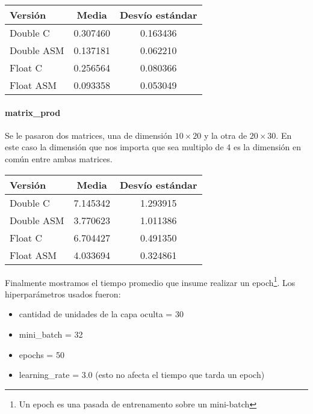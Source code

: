 \begin{center}
    \begin{tabular}{| l | c | c |}
                \hline
    Versión & Media & Desvío estándar \\
                \hline
    Double C & 0.307460 & 0.163436 \\
    Double ASM & 0.137181 & 0.062210 \\
    Float C & 0.256564 & 0.080366 \\
    Float ASM  & 0.093358 & 0.053049 \\
                \hline
            
        \end{tabular}
\end{center}

\paragraph{matrix\_prod}

Se le pasaron dos matrices, una de dimensión $10\times 20$ y la otra de $20\times 30$. En este caso la dimensión que nos importa que sea multiplo de 4 es la dimensión en común entre ambas matrices.

\begin{center}
    \begin{tabular}{| l | c | c |}
                \hline
    Versión & Media & Desvío estándar \\
                \hline
    Double C & 7.145342 & 1.293915 \\
    Double ASM & 3.770623 & 1.011386 \\
    Float C & 6.704427 & 0.491350 \\
    Float ASM  & 4.033694 & 0.324861 \\
                \hline
            
        \end{tabular}
\end{center}

Finalmente mostramos el tiempo promedio que insume realizar un epoch\footnote{Un epoch es una pasada de entrenamento sobre un mini-batch}. Los hiperparámetros usados fueron:
\begin{itemize}
    \item cantidad de unidades de la capa oculta = 30
    \item mini\_batch = 32
    \item epochs = 50
    \item learning\_rate = 3.0 (esto no afecta el tiempo que tarda un epoch)
\end{itemize}

